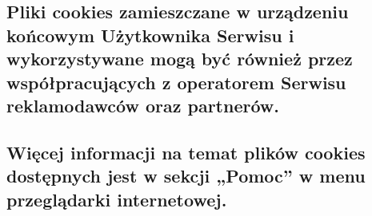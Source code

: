 \subsection{Pliki cookies zamieszczane w urządzeniu końcowym Użytkownika Serwisu i wykorzystywane mogą być również przez współpracujących z operatorem Serwisu reklamodawców oraz partnerów.}

\subsection{Więcej informacji na temat plików cookies dostępnych jest w sekcji „Pomoc” w menu przeglądarki internetowej.}
 
